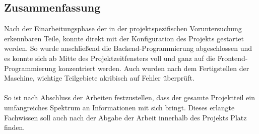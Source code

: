 \subsection{Zusammenfassung}
Nach der Einarbeitungsphase der in der projektspezifischen Voruntersuchung erkennbaren Teile, konnte direkt mit der Konfiguration des Projekts gestartet werden.
So wurde anschließend die Backend-Programmierung abgeschlossen und es konnte sich ab Mitte des Projektzeitfensters voll und ganz auf die Frontend-Programmierung konzentriert werden.
Auch wurden nach dem Fertigstellen der Maschine, wichtige Teilgebiete akribisch auf Fehler überprüft.\\\\
\newpage
So ist nach Abschluss der Arbeiten festzustellen, dass der gesamte Projektteil ein umfangreiches Spektrum an Informationen mit sich bringt.
Dieses erlangte Fachwissen soll auch nach der Abgabe der Arbeit innerhalb des Projekts Platz finden.
